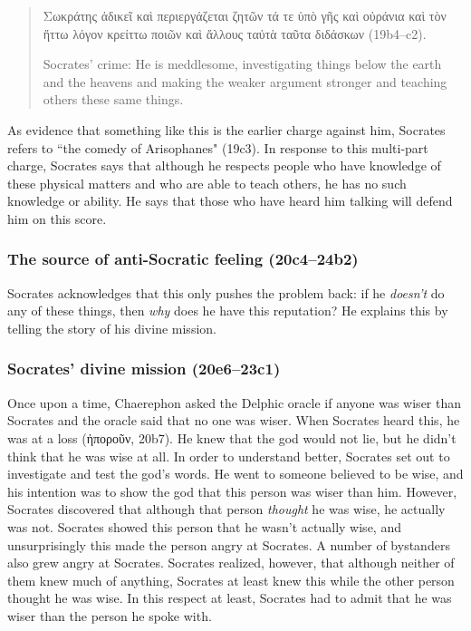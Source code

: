 \documentclass[11pt]{article}
\begin{document}
\begin{quote}
    Σωκράτης ἀδικεῖ καὶ περιεργάζεται ζητῶν τά τε ὑπὸ γῆς καὶ οὐράνια καὶ τὸν ἥττω λόγον κρείττω ποιῶν καὶ ἄλλους ταὐτὰ ταῦτα διδάσκων (19b4--c2).

    Socrates' crime: He is meddlesome, investigating things below the earth and the heavens and making the weaker argument stronger and teaching others these same things.
\end{quote}

As evidence that something like this is the earlier charge against him, Socrates refers to ``the comedy of Arisophanes" (19c3).  In response to this multi-part charge, Socrates says that although he respects people who have knowledge of these physical matters and who are able to teach others, he has no such knowledge or ability.  He says that those who have heard him talking will defend him on this score.

\subsubsection{The source of anti-Socratic feeling (20c4--24b2)}

Socrates acknowledges that this only pushes the problem back: if he \emph{doesn't} do any of these things, then \emph{why} does he have this reputation?  He explains this by telling the story of his divine mission.

\subsubsection{Socrates' divine mission (20e6--23c1)}

Once upon a time, Chaerephon asked the Delphic oracle if anyone was wiser than Socrates and the oracle said that no one was wiser.  When Socrates heard this, he was at a loss (ἠποροῦν, 20b7).  He knew that the god would not lie, but he didn't think that he was wise at all.  In order to understand better, Socrates set out to investigate and test the god's words.  He went to someone believed to be wise, and his intention was to show the god that this person was wiser than him.  However, Socrates discovered that although that person \emph{thought} he was wise, he actually was not.  Socrates showed this person that he wasn't actually wise, and unsurprisingly this made the person angry at Socrates.  A number of bystanders also grew angry at Socrates.  Socrates realized, however, that although neither of them knew much of anything, Socrates at least knew this while the other person thought he was wise. In this respect at least, Socrates had to admit that he was wiser than the person he spoke with.
\end{document}
